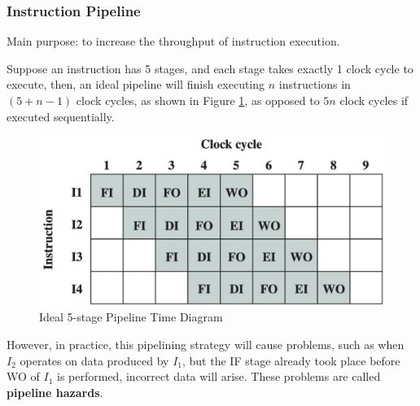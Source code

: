 \subsubsection{Instruction Pipeline}

Main purpose: to increase the throughput of instruction execution.

Suppose an instruction has 5 stages, and each stage takes exactly 1 clock cycle to execute,
then, an ideal pipeline will finish executing $n$ instructions in $(5 + n - 1)$ clock cycles,
as shown in Figure \ref{fig:ideal-5-stage-pipeline-time-diagram}, as opposed to $5n$ clock cycles
if executed sequentially.

\begin{figure}[H]
    \centering
    \includegraphics[width=0.4\linewidth]{chaps/instructions-sets/ideal-5-stage-pipeline-time-diagram.png}
    \caption{Ideal 5-stage Pipeline Time Diagram}
    \label{fig:ideal-5-stage-pipeline-time-diagram}
\end{figure}

However, in practice, this pipelining strategy will cause problems, such as when $I_2$ operates on
data produced by $I_1$, but the IF stage already took place before WO of $I_1$ is performed,
incorrect data will arise. These problems are called \textbf{pipeline hazards}.

